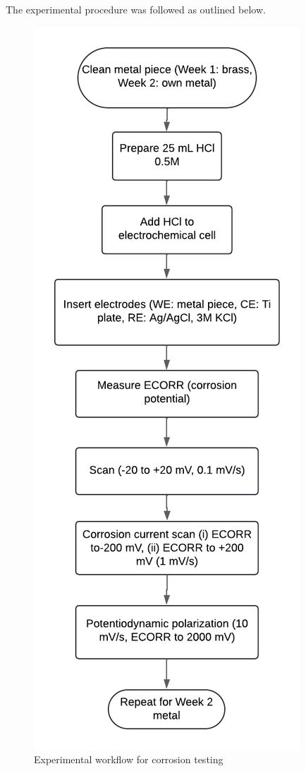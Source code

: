 The experimental procedure was followed as outlined below.

\begin{figure}[ht!]
    \centering
    \includegraphics[width=0.50\columnwidth]{Figures/FLOWCHART 4.png}
    \caption{Experimental workflow for corrosion testing}
    \label{fig:EW}
\end{figure}

